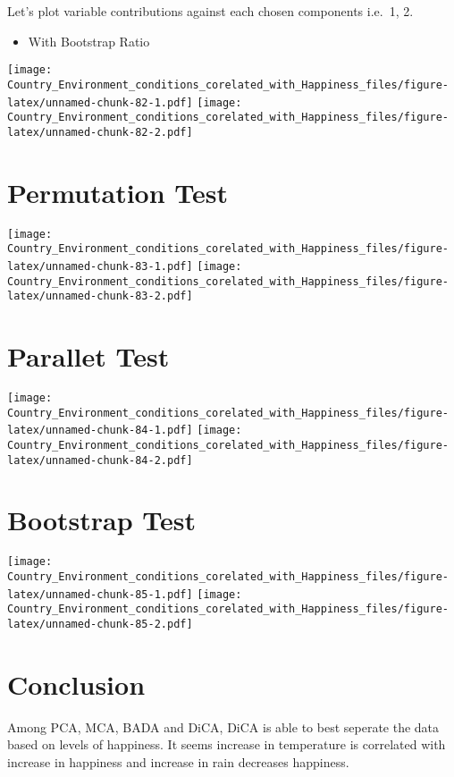 \documentclass[]{book}
\providecommand{\tightlist}{%
  \setlength{\itemsep}{0pt}\setlength{\parskip}{0pt}}
\begin{document}
Let's plot variable contributions against each chosen components i.e.~1,
2.

\begin{itemize}
\tightlist
\item
  With Bootstrap Ratio
\end{itemize}

\texttt{[image: Country\_Environment\_conditions\_corelated\_with\_Happiness\_files/figure-latex/unnamed-chunk-82-1.pdf]}
\texttt{[image: Country\_Environment\_conditions\_corelated\_with\_Happiness\_files/figure-latex/unnamed-chunk-82-2.pdf]}

\hypertarget{permutation-test-3}{%
\section{Permutation Test}\label{permutation-test-3}}

\texttt{[image: Country\_Environment\_conditions\_corelated\_with\_Happiness\_files/figure-latex/unnamed-chunk-83-1.pdf]}
\texttt{[image: Country\_Environment\_conditions\_corelated\_with\_Happiness\_files/figure-latex/unnamed-chunk-83-2.pdf]}

\hypertarget{parallet-test-3}{%
\section{Parallet Test}\label{parallet-test-3}}

\texttt{[image: Country\_Environment\_conditions\_corelated\_with\_Happiness\_files/figure-latex/unnamed-chunk-84-1.pdf]}
\texttt{[image: Country\_Environment\_conditions\_corelated\_with\_Happiness\_files/figure-latex/unnamed-chunk-84-2.pdf]}

\hypertarget{bootstrap-test-4}{%
\section{Bootstrap Test}\label{bootstrap-test-4}}

\texttt{[image: Country\_Environment\_conditions\_corelated\_with\_Happiness\_files/figure-latex/unnamed-chunk-85-1.pdf]}
\texttt{[image: Country\_Environment\_conditions\_corelated\_with\_Happiness\_files/figure-latex/unnamed-chunk-85-2.pdf]}

\hypertarget{conclusion-4}{%
\section{Conclusion}\label{conclusion-4}}

Among PCA, MCA, BADA and DiCA, DiCA is able to best seperate the data
based on levels of happiness. It seems increase in temperature is
correlated with increase in happiness and increase in rain decreases
happiness.
\end{document}
